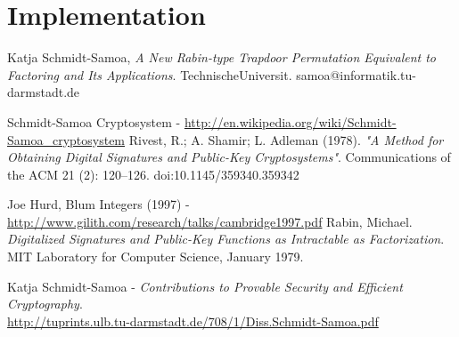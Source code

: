 \documentclass[12pt]{article} %
\begin{document}
\section{Implementation}

%
%





\begin{thebibliography}{9}
Katja Schmidt-Samoa, 
\emph{A New Rabin-type Trapdoor Permutation Equivalent to Factoring and Its Applications}. TechnischeUniversit. samoa@informatik.tu-darmstadt.de

  Schmidt-Samoa Cryptosystem - 
 \url{http://en.wikipedia.org/wiki/Schmidt-Samoa_cryptosystem}
 Rivest, R.; A. Shamir; L. Adleman (1978). \emph{"A Method for Obtaining Digital Signatures and Public-Key Cryptosystems"}. Communications of the ACM 21 (2): 120–126. doi:10.1145/359340.359342

 Joe Hurd, Blum Integers (1997) -  \url{http://www.gilith.com/research/talks/cambridge1997.pdf}
Rabin, Michael. \emph{Digitalized Signatures and Public-Key Functions as Intractable as Factorization}. MIT Laboratory for Computer Science, January 1979.

Katja Schmidt-Samoa - \emph{Contributions to Provable Security and Efficient Cryptography}.\\\url{http://tuprints.ulb.tu-darmstadt.de/708/1/Diss.Schmidt-Samoa.pdf}
\end{thebibliography}
\newpage
\end{document}

